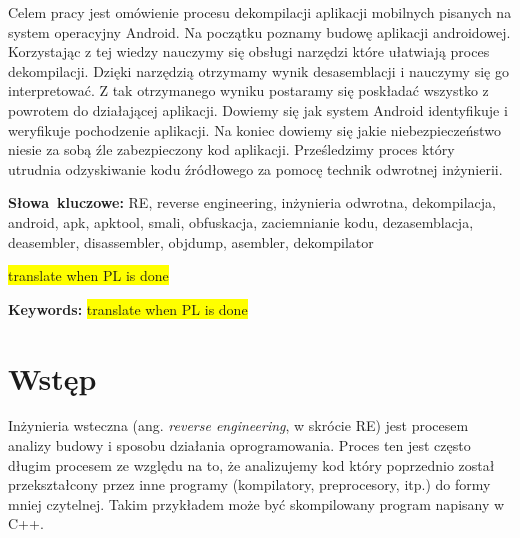 \documentclass[12pt,a4paper,leqno,oneside,titlepage]{book}
\newenvironment{abstractpage}
  {\cleardoublepage\vspace*{\fill}\thispagestyle{empty}}
  {\vfill\cleardoublepage}
\newenvironment{abstract}[1]
  {\bigskip\selectlanguage{#1}%
   \begin{center}\bfseries\abstractname\end{center}}
  {\par\bigskip}
\newcommand{\todo}[1]{\colorbox{yellow}{#1}}
\begin{document}
\begin{abstractpage}
\begin{abstract}{polish}
Celem pracy jest omówienie procesu dekompilacji aplikacji mobilnych pisanych na system operacyjny Android.
Na początku poznamy budowę aplikacji androidowej. Korzystając z tej wiedzy nauczymy się obsługi narzędzi które ułatwiają proces dekompilacji. Dzięki narzędzią otrzymamy wynik desasemblacji i nauczymy się go interpretować. Z tak otrzymanego wyniku postaramy się poskładać wszystko z powrotem do działającej aplikacji. Dowiemy się jak system Android identyfikuje i weryfikuje pochodzenie aplikacji. Na koniec dowiemy się jakie niebezpieczeństwo niesie za sobą źle zabezpieczony kod aplikacji. Prześledzimy proces który utrudnia odzyskiwanie kodu źródłowego za pomocę technik odwrotnej inżynierii.
 
\end{abstract}
\smallskip
\noindent \textbf{Słowa~kluczowe:} RE, reverse engineering, inżynieria odwrotna, dekompilacja, android, apk, apktool, smali, obfuskacja, zaciemnianie kodu, dezasemblacja, deasembler, disassembler, objdump, asembler, dekompilator

\begin{abstract}{english}
\todo{translate when PL is done}
\end{abstract}
\smallskip
\noindent \textbf{Keywords:} \todo{translate when PL is done}
\end{abstractpage}

\mainmatter


\chapter*{Wstęp}

Inżynieria wsteczna (ang. \emph{reverse engineering}, w skrócie RE) jest procesem analizy budowy i sposobu działania oprogramowania. Proces ten jest często długim procesem ze względu na to, że analizujemy kod który poprzednio został przekształcony przez inne programy (kompilatory, preprocesory, itp.) do formy mniej czytelnej. Takim przykładem może być skompilowany program napisany w C++.
\end{document}
